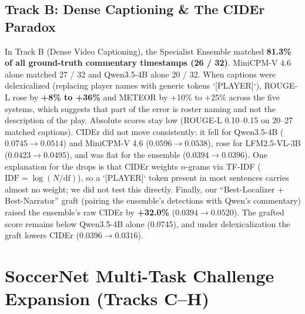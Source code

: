 \documentclass[10pt,twocolumn,letterpaper]{article}
\begin{document}
\begin{table}[h]
\centering
\small
\caption{\textbf{In-Sample vs.\ 5-Fold Leave-One-Chunk-Out (LOCO) Routing on Game~0 Half~1 (65 events; hits are matched events within the stated tolerance).}}
\label{tab:loco_cv}
\end{table}

\subsection{Track B: Dense Captioning \& The CIDEr Paradox}
In Track B (Dense Video Captioning), the Specialist Ensemble matched \textbf{81.3\% of all ground-truth commentary timestamps (26 / 32)}.
MiniCPM-V 4.6 alone matched 27 / 32 and Qwen3.5-4B alone 20 / 32.
When captions were delexicalized (replacing player names with generic tokens `[PLAYER]`), ROUGE-L rose by \textbf{+8\% to +36\%} and METEOR by +10\% to +25\% across the five systems, which suggests that part of the error is roster naming and not the description of the play. Absolute scores stay low (ROUGE-L 0.10--0.15 on 20--27 matched captions).
CIDEr did not move consistently: it fell for Qwen3.5-4B ($0.0745 \to 0.0514$) and MiniCPM-V 4.6 ($0.0596 \to 0.0538$), rose for LFM2.5-VL-3B ($0.0423 \to 0.0495$), and was flat for the ensemble ($0.0394 \to 0.0396$). One explanation for the drops is that CIDEr weights $n$-grams via TF-IDF ($\text{IDF} = \log(N/\text{df})$), so a `[PLAYER]` token present in most sentences carries almost no weight; we did not test this directly.
Finally, our ``Best-Localizer + Best-Narrator'' graft (pairing the ensemble's detections with Qwen's commentary) raised the ensemble's raw CIDEr by \textbf{+32.0\%} ($0.0394 \to 0.0520$). The grafted score remains below Qwen3.5-4B alone (0.0745), and under delexicalization the graft lowers CIDEr ($0.0396 \to 0.0316$).

\section{SoccerNet Multi-Task Challenge Expansion (Tracks C--H)}
\label{sec:multitask}
\end{document}
